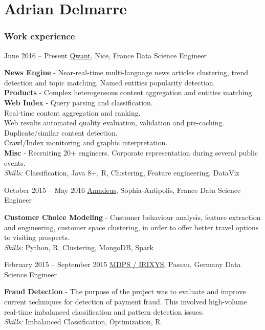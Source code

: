 \documentclass{tccv}
\renewcommand{\it}{\textit}
\renewcommand{\bf}{\textbf}
\begin{document}
\part{Adrian Delmarre}

\section{Work experience}

\begin{eventlist}

\item{June 2016 -- Present}
    {\href{https://www.qwant.com}{Qwant}, Nice, France}
    {Data Science Engineer}

\bf{News Engine} - Near-real-time multi-language news articles clustering, trend detection and topic matching. Named entities popularity detection.\\
\bf{Products} - Complex heterogeneous content aggregation and entities matching.\\
\bf{Web Index} - Query parsing and classification. \\
Real-time content aggregation and ranking.\\
Web results automated quality evaluation, validation and pre-caching.\\
Duplicate/similar content detection.\\
Crawl/Index monitoring and graphic interpretation.\\
\bf{Misc} - Recruiting 20+ engineers. Corporate representation during several public events.\\
\it{Skills:} Classification, Java 8+, R, Clustering, Feature engineering, DataViz

\item{October 2015 -- May 2016}
    {\href{http://www.amadeus.com/}{Amadeus}, Sophia-Antipolis, France}
    {Data Science Engineer}

\bf{Customer Choice Modeling} - Customer behaviour analysis, feature extraction and engineering, customer space clustering, in order to offer better travel options to visiting prospects.\\
\it{Skills:} Python, R, Clustering, MongoDB, Spark

\item{February 2015 -- September 2015}
    {\href{http://irixys.org/}{MDPS / IRIXYS}, Passau, Germany}
    {Data Science Engineer}

\bf{Fraud Detection} - The purpose of the project was to evaluate and improve current techniques for detection of payment fraud. This involved high-volume real-time imbalanced classification and pattern detection issues.\\
\it{Skills:} Imbalanced Classification, Optimization, R


\end{eventlist}
\end{document}
